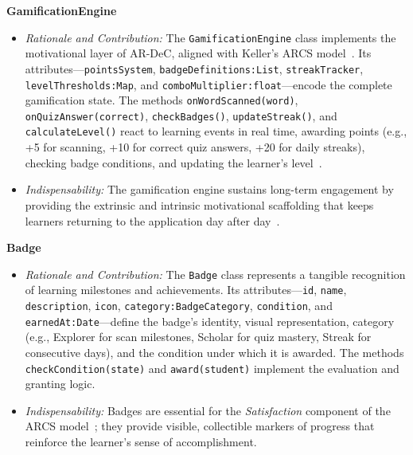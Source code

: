 \medskip
\textbf{GamificationEngine}
\begin{itemize}
\item \textit{Rationale and Contribution:} The \texttt{GamificationEngine} class implements the motivational layer of AR-DeC, aligned with Keller's ARCS model~\cite{Keller2010}. Its attributes---\texttt{pointsSystem}, \texttt{badgeDefinitions:List}, \texttt{streakTracker}, \texttt{levelThresholds:Map}, and \texttt{comboMultiplier:float}---encode the complete gamification state. The methods \texttt{onWordScanned(word)}, \texttt{onQuizAnswer(correct)}, \texttt{checkBadges()}, \texttt{updateStreak()}, and \texttt{calculateLevel()} react to learning events in real time, awarding points (e.g., +5 for scanning, +10 for correct quiz answers, +20 for daily streaks), checking badge conditions, and updating the learner's level~\cite{Deterding2011,Sailer2017}.
\item \textit{Indispensability:} The gamification engine sustains long-term engagement by providing the extrinsic and intrinsic motivational scaffolding that keeps learners returning to the application day after day~\cite{Hamari2014}.
\end{itemize}

\medskip
\textbf{Badge}
\begin{itemize}
\item \textit{Rationale and Contribution:} The \texttt{Badge} class represents a tangible recognition of learning milestones and achievements. Its attributes---\texttt{id}, \texttt{name}, \texttt{description}, \texttt{icon}, \texttt{category:BadgeCategory}, \texttt{condition}, and \texttt{earnedAt:Date}---define the badge's identity, visual representation, category (e.g., Explorer for scan milestones, Scholar for quiz mastery, Streak for consecutive days), and the condition under which it is awarded. The methods \texttt{checkCondition(state)} and \texttt{award(student)} implement the evaluation and granting logic.
\item \textit{Indispensability:} Badges are essential for the \emph{Satisfaction} component of the ARCS model~\cite{Keller2010}; they provide visible, collectible markers of progress that reinforce the learner's sense of accomplishment.
\end{itemize}

